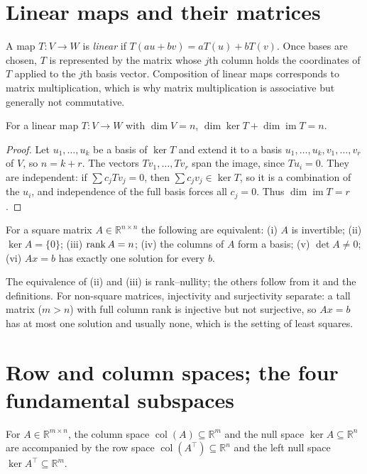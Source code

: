 \section{Linear maps and their matrices}
A map $T:V\to W$ is \emph{linear} if $T(au+bv)=aT(u)+bT(v)$. Once bases are chosen, $T$ is represented by the matrix whose $j$th column holds the coordinates of $T$ applied to the $j$th basis vector. Composition of linear maps corresponds to matrix multiplication, which is why matrix multiplication is associative but generally not commutative.

\begin{theorem}
For a linear map $T:V\to W$ with $\dim V=n$, $\dim\ker T+\dim\operatorname{im}T=n$.
\end{theorem}
\begin{proof}
Let $u_1,\ldots,u_k$ be a basis of $\ker T$ and extend it to a basis $u_1,\ldots,u_k,v_1,\ldots,v_r$ of $V$, so $n=k+r$. The vectors $Tv_1,\ldots,Tv_r$ span the image, since $Tu_i=0$. They are independent: if $\sum c_jTv_j=0$, then $\sum c_jv_j\in\ker T$, so it is a combination of the $u_i$, and independence of the full basis forces all $c_j=0$. Thus $\dim\operatorname{im}T=r$.
\end{proof}

\begin{proposition}
For a square matrix $A\in\mathbb R^{n\times n}$ the following are equivalent: (i) $A$ is invertible; (ii) $\ker A=\{0\}$; (iii) $\operatorname{rank} A=n$; (iv) the columns of $A$ form a basis; (v) $\det A\ne0$; (vi) $Ax=b$ has exactly one solution for every $b$.
\end{proposition}
The equivalence of (ii) and (iii) is rank--nullity; the others follow from it and the definitions. For non-square matrices, injectivity and surjectivity separate: a tall matrix ($m>n$) with full column rank is injective but not surjective, so $Ax=b$ has at most one solution and usually none, which is the setting of least squares.

\section{Row and column spaces; the four fundamental subspaces}
For $A\in\mathbb R^{m\times n}$, the column space $\operatorname{col}(A)\subseteq\mathbb R^m$ and the null space $\ker A\subseteq\mathbb R^n$ are accompanied by the row space $\operatorname{col}(A^\top)\subseteq\mathbb R^n$ and the left null space $\ker A^\top\subseteq\mathbb R^m$.

